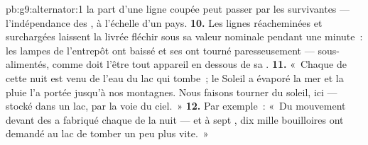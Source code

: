 \begin{solution}{pb:g9:alternator:1}
la part d'une ligne coupée peut passer par les  survivantes
--- l'indépendance des  , à l'échelle d'un pays.
\textbf{10.} Les lignes réacheminées et surchargées laissent la
 livrée fléchir sous sa valeur nominale pendant une minute~:
les lampes de l'entrepôt ont baissé et ses  ont tourné
paresseusement --- sous-alimentés, comme doit l'être tout appareil en
dessous de sa .
\textbf{11.} «~Chaque  de cette nuit est venu de l'eau du lac qui
tombe~; le Soleil a évaporé la mer et la pluie l'a portée jusqu'à nos
montagnes. Nous faisons tourner du soleil, ici --- stocké dans un lac,
par la voie du ciel.~»
\textbf{12.} Par exemple~: «~Du mouvement devant des  a
fabriqué chaque  de la nuit --- et à sept , dix mille
bouilloires ont demandé au lac de tomber un peu plus vite.~»
\end{solution}
